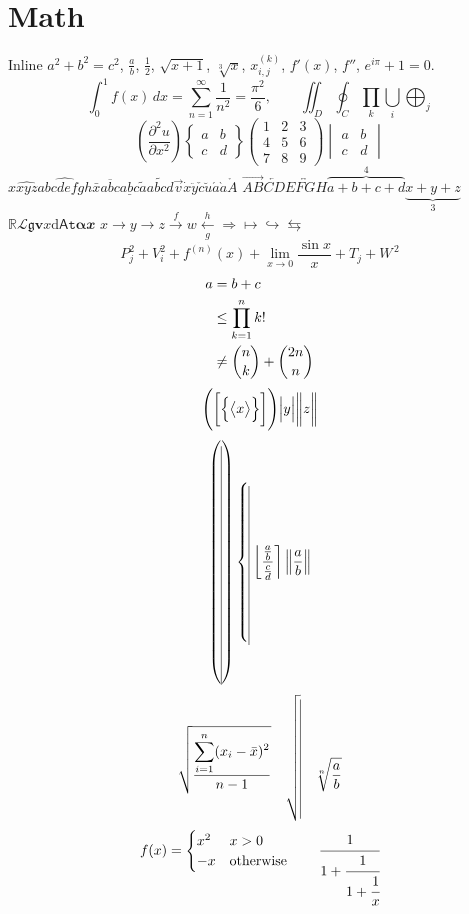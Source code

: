 \section{Math}
Inline $a^2+b^2=c^2$, $\frac{a}{b}$, $\tfrac12$, $\sqrt{x+1}$, $\sqrt[3]{x}$, $x_{i,j}^{(k)}$, $f'(x)$, $f''$, $e^{i\pi}+1=0$.
\[ \int_0^1 f(x)\,dx = \sum_{n=1}^\infty \frac{1}{n^2} = \frac{\pi^2}{6},\qquad \iint_D \oint_C \prod_{k}\bigcup_{i}\bigoplus_j \]
\[ \left( \frac{\partial^2 u}{\partial x^2} \right) \left\{ \begin{matrix} a & b \\ c & d \end{matrix} \right\}
   \begin{pmatrix} 1 & 2 & 3\\ 4 & 5 & 6 \\ 7&8&9 \end{pmatrix} \begin{vmatrix} a & b \\ c & d\end{vmatrix} \]
$\hat{x}\widehat{xyz}\widehat{abcdefgh}\bar{x}\overline{abc}\underline{abc}\tilde{a}\widetilde{abcd}\vec{v}\dot{x}\ddot{y}\check{c}\breve{u}\acute{a}\grave{a}\mathring{A}$
$\overrightarrow{AB}\overleftarrow{CD}\overleftrightarrow{EFGH} \overbrace{a+b+c+d}^{4}\underbrace{x+y+z}_{3}$
$\mathbb{R}\mathcal{L}\mathfrak{g}\mathbf{v}\mathit{x}\mathrm{d}\mathsf{A}\mathtt{t}\symbf{\alpha}\mathbfit{x}$
$x \to y \longrightarrow z \xrightarrow{f} w \xleftarrow[g]{h} \Rightarrow \mapsto \hookrightarrow \leftrightarrows$
\begin{equation} P_j^2 + V_i^2 + f^{(n)}(x) + \lim_{x\to 0} \frac{\sin x}{x} + T_{\!j} + W^{\,2} \label{eq:a} \end{equation}
\begin{align} a &= b + c \\ &\leq \prod_{k=1}^{n} k! \notag \\ &\ne \binom{n}{k} + \dbinom{2n}{n} \end{align}
\[ \Biggl( \biggl[ \Bigl\{ \bigl\langle x \bigr\rangle \Bigr\} \biggr] \Biggr) \Bigl\lvert y \Bigr\rvert \bigg\| z \bigg\| \]
\[ \left( \vrule height 3cm depth 3cm \right) \left\{ \vrule height 2cm depth 2cm \right. \left\lfloor \frac{\frac{a}{b}}{\frac{c}{d}} \right\rceil \left\| \frac{a}{b} \right\| \]
\[ \sqrt{\frac{\displaystyle\sum_{i=1}^{n}(x_i-\bar x)^2}{n-1}} \quad \sqrt{\vrule height 2cm depth 1cm} \quad \sqrt[n]{\frac{a}{b}} \]
\[ f(x) = \begin{cases} x^2 & x > 0 \\ -x & \text{otherwise} \end{cases} \qquad \cfrac{1}{1+\cfrac{1}{1+\cfrac{1}{x}}} \]
